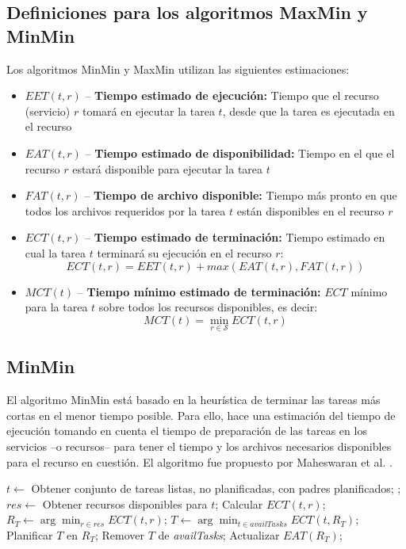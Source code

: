 \subsection{Definiciones para los algoritmos MaxMin y MinMin}
\label{alg:def_maxmin}
Los algoritmos MinMin y MaxMin utilizan las siguientes estimaciones: %
\begin{itemize}
\item{$EET(t,r)$ -- \textbf{Tiempo estimado de ejecución:} Tiempo que el recurso (servicio) $r$ tomará en ejecutar la tarea $t$, desde que la tarea es ejecutada en el recurso}
\item{$EAT(t,r)$ -- \textbf{Tiempo estimado de disponibilidad:} Tiempo en el que el recurso $r$ estará disponible para ejecutar la tarea $t$}
\item{$FAT(t,r)$ -- \textbf{Tiempo de archivo disponible:} Tiempo más pronto en que todos los archivos requeridos por la tarea $t$ están disponibles en el recurso $r$}
\item{$ECT(t,r)$ -- \textbf{Tiempo estimado de terminación:} Tiempo estimado en cual la tarea $t$ terminará su ejecución en el recurso $r$: 
              \[ ECT(t,r) = EET(t,r) + max(EAT(t,r), FAT(t,r)) \]}
\item{$MCT(t)$ -- \textbf{Tiempo mínimo estimado de terminación: } $ECT$ mínimo para la tarea $t$ sobre todos los recursos disponibles, es decir: 
            \[ MCT(t) = \min_{r \in \mathcal{S}} ECT(t,r) \]}
\end{itemize}

\subsection{MinMin}
\label{alg:min-min}
El algoritmo MinMin está basado en la heurística de terminar las tareas más cortas en el menor tiempo posible. Para ello, hace una estimación del tiempo de ejecución tomando en cuenta el tiempo de preparación de las tareas en los servicios --o recursos-- para tener el tiempo y los archivos necesarios disponibles para el recurso en cuestión. El algoritmo fue propuesto por Maheswaran et al. \cite{maheswaran1999dynamic}. 
\\
\begin{algorithmic}[1]
	\State $t \gets$ Obtener conjunto de tareas listas, no planificadas, con padres planificados;
	\State {};
\EndWhile
{}
			\State $res \gets$ Obtener recursos disponibles para $t$;
				\State Calcular $ECT(t,r)$;
			\EndFor
			\State $R_T \gets \arg\min_{r \in res}ECT(t,r)$;
		\EndFor
		\State $T \gets \arg\min_{t \in availTasks}ECT(t,R_T)$;
		\State Planificar $T$ en $R_T$;
		\State Remover $T$ de \emph{availTasks};
		\State Actualizar $EAT(R_T)$;
	\EndWhile
\EndProcedure
\end{algorithmic}

